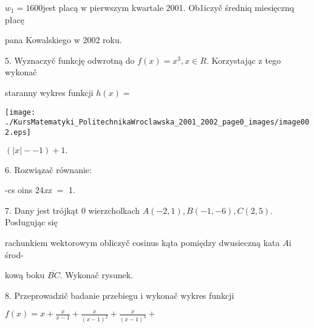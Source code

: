 \documentclass[a4paper,12pt]{article}
\begin{document}
$w_{1}=1600$jest placą $\mathrm{w}$ pierwszym kwartale 2001. Ob1iczyč średniq miesięcznq płacę

pana Kowalskiego $\mathrm{w}$ 2002 roku.

5. Wyznaczyč funkcję odwrotną do $f(x) =x^{3}, x\in R$. Korzystając $\mathrm{z}$ tego wykonač

staranny wykres funkcji $h(x) =$
\begin{center}
\texttt{[image: ./KursMatematyki\_PolitechnikaWroclawska\_2001\_2002\_page0\_images/image002.eps]}
\end{center}
$(|x|-- 1)+1.$

6. Rozwiązač równanie:

-cs  oins 24{\it xx} $=$ 1.

7. Dany jest trójkąt $0$ wierzcholkach $A(-2,1), B(-1,-6), C(2,5)$. Posługując się

rachunkiem wektorowym obliczyč cosinus kąta pomiędzy dwusieczną kata $A\mathrm{i}$ środ-

kową boku $\overline{BC}$. Wykonač rysunek.

8. Przeprowadzič badanie przebiegu $\mathrm{i}$ wykonač wykres funkcji

$f(x)=x+\displaystyle \frac{x}{x-1}+\frac{x}{(x-1)^{2}}+\frac{x}{(x-1)^{3}}+$
\end{document}

